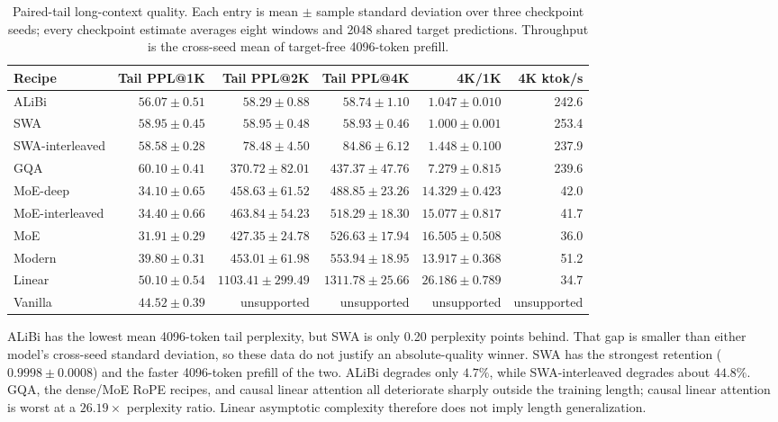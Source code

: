 \documentclass[11pt,a4paper]{article}
\theoremstyle{definition}
\theoremstyle{plain}
\begin{document}
\begin{table}[H]
\centering
\scriptsize
\begin{tabular}{lrrrrr}
\toprule
Recipe & Tail PPL@1K & Tail PPL@2K & Tail PPL@4K & 4K/1K & 4K ktok/s \\
\midrule
ALiBi & $56.07\pm0.51$ & $58.29\pm0.88$ & $58.74\pm1.10$ & $1.047\pm0.010$ & 242.6 \\
SWA & $58.95\pm0.45$ & $58.95\pm0.48$ & $58.93\pm0.46$ & $1.000\pm0.001$ & 253.4 \\
SWA-interleaved & $58.58\pm0.28$ & $78.48\pm4.50$ & $84.86\pm6.12$ & $1.448\pm0.100$ & 237.9 \\
GQA & $60.10\pm0.41$ & $370.72\pm82.01$ & $437.37\pm47.76$ & $7.279\pm0.815$ & 239.6 \\
MoE-deep & $34.10\pm0.65$ & $458.63\pm61.52$ & $488.85\pm23.26$ & $14.329\pm0.423$ & 42.0 \\
MoE-interleaved & $34.40\pm0.66$ & $463.84\pm54.23$ & $518.29\pm18.30$ & $15.077\pm0.817$ & 41.7 \\
MoE & $31.91\pm0.29$ & $427.35\pm24.78$ & $526.63\pm17.94$ & $16.505\pm0.508$ & 36.0 \\
Modern & $39.80\pm0.31$ & $453.01\pm61.98$ & $553.94\pm18.95$ & $13.917\pm0.368$ & 51.2 \\
Linear & $50.10\pm0.54$ & $1103.41\pm299.49$ & $1311.78\pm25.66$ & $26.186\pm0.789$ & 34.7 \\
Vanilla & $44.52\pm0.39$ & unsupported & unsupported & unsupported & unsupported \\
\bottomrule
\end{tabular}
\caption{Paired-tail long-context quality.  Each entry is mean $\pm$ sample
standard deviation over three checkpoint seeds; every checkpoint estimate averages
eight windows and 2048 shared target predictions.  Throughput is the cross-seed
mean of target-free 4096-token prefill.}
\label{tab:inference-long-context-final}
\end{table}

ALiBi has the lowest mean 4096-token tail perplexity, but SWA is only 0.20
perplexity points behind.  That gap is smaller than either model's cross-seed
standard deviation, so these data do not justify an absolute-quality winner.
SWA has the strongest retention ($0.9998\pm0.0008$) and the faster 4096-token
prefill of the two.  ALiBi degrades only $4.7\%$, while SWA-interleaved degrades
about $44.8\%$.  GQA, the dense/MoE RoPE recipes, and causal linear attention
all deteriorate sharply outside the training length; causal linear attention is
worst at a $26.19\times$ perplexity ratio.  Linear asymptotic complexity therefore
does not imply length generalization.
\end{document}
